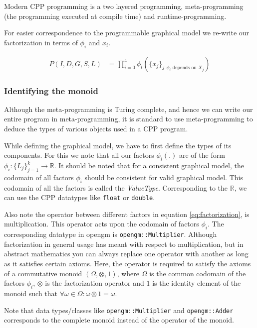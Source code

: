 \documentclass[12pt,oneside,letterpaper]{article}
\begin{document}
Modern CPP programming is a two layered programming, meta-programming (the
programming executed at compile time) and runtime-programming. 

For easier correspondence to the programmable graphical model we re-write our 
factorization in terms of $\phi_i$ and $x_i$.

\begin{align}
  P(I, D, G, S, L) &= \prod_{i=0}^{4} \phi_i(\{ x_j \}_{j : \phi_i \text{ depends on } X_j})
  \label{eq:factorization}
\end{align}

\subsubsection{Identifying the monoid}
Although the meta-programming is Turing complete, and hence we can write our
entire program in meta-programming, it is standard to use meta-programming to
deduce the types of various objects used in a CPP program.

While defining the graphical model, we have to first define the types of its
components. For this we note that all our factors $\phi_i(.)$ are of the form
$\phi_i : \{L_j\}_{j=1}^{k} \rightarrow \mathbb{R}$. It should be noted that
for a consistent graphical model, the codomain of all factors $\phi_i$ should
be consistent for valid graphical model. This codomain of all the factors is called
the \emph{ValueType}. Corresponding to the $\mathbb{R}$, we can use the CPP
datatypes like \lstinline|float| or \lstinline|double|.

Also note the operator between different factors in equation
\eqref{eq:factorization}, is multiplication. This operator acts upon the
codomain of factors $\phi_i$. The corresponding datatype in opengm is \lstinline|opengm::Multiplier|. 
Although factorization in general usage has meant with respect to multiplication, but in
abstract mathematics you can always replace one operator with another as long as it satisfies certain
axioms. Here, the operator is required to satisfy the axioms of a commutative
monoid $(\Omega, \otimes, 1)$, where $\Omega$ is the common codomain of the
factors $\phi_i$, $\otimes$ is the factorization operator and $1$ is the
identity element of the monoid such that $\forall \omega \in \Omega : \omega
\otimes 1 = \omega$. 

Note that data types/classes like \lstinline|opengm::Multiplier| and \lstinline|opengm::Adder|
corresponds to the complete monoid instead of the operator of the monoid.
\end{document}
